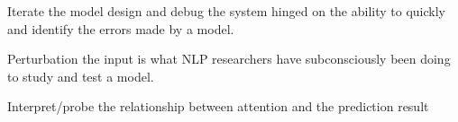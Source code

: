 

Iterate the model design and debug the system hinged on the ability to quickly and identify the errors made by a model.

Perturbation the input is what NLP researchers have subconsciously been doing to study and test a model.

Interpret/probe the relationship between attention and the prediction result




